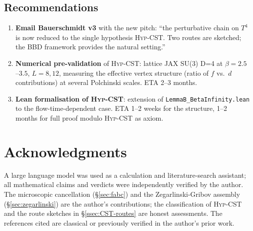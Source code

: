 \documentclass[11pt,a4paper]{amsart}
\theoremstyle{definition}
\begin{document}
\subsection{Recommendations}

\begin{enumerate}[leftmargin=2em]
\item \textbf{Email Bauerschmidt v3} with the new pitch: ``the perturbative
chain on $T^4$ is now reduced to the single hypothesis \textsc{Hyp-CST}.
Two routes are sketched; the BBD framework provides the natural setting.''
\item \textbf{Numerical pre-validation} of \textsc{Hyp-CST}: lattice
JAX SU(3) D=4 at $\beta = 2.5$--$3.5$, $L = 8, 12$, measuring the
effective vertex structure (ratio of $f$ vs.\ $d$ contributions) at
several Polchinski scales. ETA 2--3 months.
\item \textbf{Lean formalisation of \textsc{Hyp-CST}}: extension of
\texttt{LemmaB\_BetaInfinity.lean} to the flow-time-dependent case.
ETA 1--2 weeks for the structure, 1--2 months for full proof modulo
\textsc{Hyp-CST} as axiom.
\end{enumerate}

\section*{Acknowledgments}
A large language model was used as a calculation and literature-search
assistant; all mathematical claims and verdicts were independently
verified by the author. The microscopic cancellation
(\S\ref{sec:fabc}) and the Zegarlinski-Gribov assembly
(\S\ref{sec:zegarlinski}) are the author's contributions; the
classification of \textsc{Hyp-CST} and the route sketches in
\S\ref{ssec:CST-routes} are honest assessments. The references
cited are classical or previously verified in the author's prior work.
\end{document}
